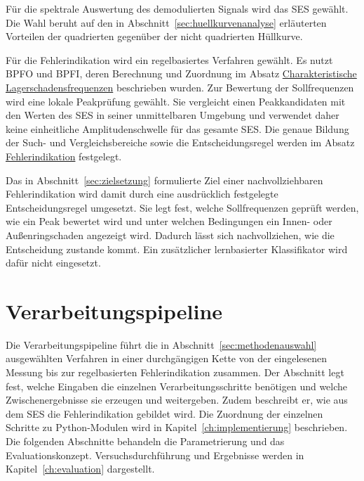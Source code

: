 
Für die spektrale Auswertung des demodulierten Signals wird das
\acrshort{SES} gewählt. Die Wahl beruht auf den in
Abschnitt~\ref{sec:huellkurvenanalyse} erläuterten Vorteilen der quadrierten
gegenüber der nicht quadrierten Hüllkurve.

Für die Fehlerindikation wird ein regelbasiertes Verfahren gewählt. Es nutzt
BPFO und BPFI, deren Berechnung und Zuordnung im Absatz
\hyperref[par:charakteristische_lagerschadensfrequenzen]
{Charakteristische Lagerschadensfrequenzen} beschrieben wurden. Zur Bewertung
der Sollfrequenzen wird eine lokale Peakprüfung gewählt. Sie vergleicht einen
Peakkandidaten mit den Werten des SES in seiner unmittelbaren Umgebung und
verwendet daher keine einheitliche Amplitudenschwelle für das gesamte SES. Die
genaue Bildung der Such- und Vergleichsbereiche sowie die Entscheidungsregel
werden im Absatz
\hyperref[par:fehlerindikation_pipeline]{Fehlerindikation} festgelegt.

Das in Abschnitt~\ref{sec:zielsetzung} formulierte Ziel einer
nachvollziehbaren Fehlerindikation wird damit durch eine ausdrücklich
festgelegte Entscheidungsregel umgesetzt. Sie legt fest, welche
Sollfrequenzen geprüft werden, wie ein Peak bewertet wird und unter welchen
Bedingungen ein Innen- oder Außenringschaden angezeigt wird. Dadurch lässt
sich nachvollziehen, wie die Entscheidung zustande kommt. Ein zusätzlicher
lernbasierter Klassifikator wird dafür nicht eingesetzt.

\section{Verarbeitungspipeline}
\label{sec:verarbeitungspipeline_konzept}

Die Verarbeitungspipeline führt die in
Abschnitt~\ref{sec:methodenauswahl} ausgewählten Verfahren in einer
durchgängigen Kette von der eingelesenen Messung bis zur regelbasierten
Fehlerindikation zusammen. Der Abschnitt legt fest, welche Eingaben die
einzelnen Verarbeitungsschritte benötigen und welche Zwischenergebnisse sie
erzeugen und weitergeben. Zudem beschreibt er, wie aus dem \acrshort{SES} die
Fehlerindikation gebildet wird. Die Zuordnung der einzelnen
Schritte zu Python-Modulen wird in Kapitel~\ref{ch:implementierung}
beschrieben. Die folgenden Abschnitte behandeln die Parametrierung und das
Evaluationskonzept. Versuchsdurchführung und Ergebnisse werden in
Kapitel~\ref{ch:evaluation} dargestellt.

